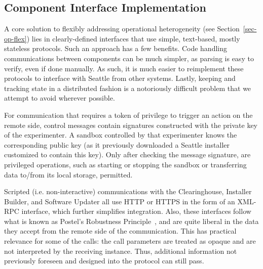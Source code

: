 %



\subsection{Component Interface Implementation}

A core solution to flexibly addressing operational heterogeneity (see
Section~\ref{sec-op-flex}) lies in clearly-defined interfaces
that use simple, text-based, mostly stateless protocols.
Such an approach has a few benefits. Code handling communications between
components can be much simpler, as parsing is easy to verify,
even if done manually. As such, it is much easier to reimplement these protocols
to interface with Seattle from other systems. Lastly, keeping
and tracking state in a distributed fashion is a notoriously
difficult problem that we attempt to avoid wherever possible.

For communication that requires a token of privilege to trigger
an action on the remote side, control messages contain signatures
constructed with the private key of the experimenter. A
sandbox controlled by that experimenter knows the
corresponding public key (as it previously downloaded a Seattle installer
customized to contain this key). Only after checking
the message signature, are privileged operations, such as starting
or stopping the sandbox or transferring data to/from its
local storage, permitted.

Scripted (i.e. non-interactive) communications with the
Clearinghouse, Installer Builder, and Software Updater all
use \gls{HTTP} or \gls{HTTPS} in the form of an
\acrshort{XML}-\acrshort{RPC} interface, which further simplifies
integration. Also, these interfaces
follow what is known as Postel's Robustness
Principle~\cite[\S2.10]{rfc793}, and are quite liberal in the
data they accept from the remote side of the communication.
This has practical relevance for some of the calls:
the call parameters are treated as opaque and are not
interpreted by the receiving instance. Thus, additional
information not previously foreseen and designed into the
protocol can still pass.

